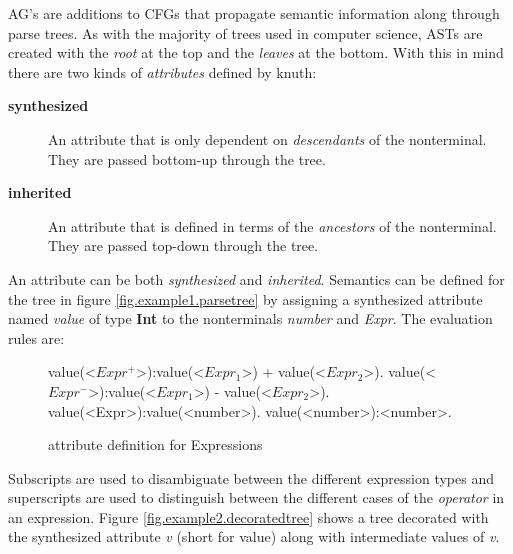 AG's are additions to CFGs that propagate semantic information along through parse trees. As with the majority of trees used in computer science, ASTs are created with the \emph{root} at the top and the \emph{leaves} at the bottom. With this in mind there are two kinds of \emph{attributes} defined by knuth\cite{knuth1}:
\begin{description}
\item[\textbf{synthesized}] An attribute that is only dependent on \emph{descendants} of the nonterminal. They are passed bottom-up through the tree.
\item[\textbf{inherited}] An attribute that is defined in terms of the \emph{ancestors} of the nonterminal. They are passed top-down through the tree.
\end{description}

An attribute can be both \emph{synthesized} and \emph{inherited}. Semantics can be defined for the tree in figure \ref{fig.example1.parsetree} by assigning a synthesized attribute named \emph{value} of type \textbf{Int} to the nonterminals \emph{number} and \emph{Expr}. The evaluation rules are:

\begin{figure}[H]
\begin{grammar}
value(<$Expr^+$>):value(<$Expr_1$>) + value(<$Expr_2$>). 
value(<$Expr^-$>):value(<$Expr_1$>) - value(<$Expr_2$>). 
value(<Expr>):value(<number>).
value(<number>):<number>.
\end{grammar}
\caption{attribute definition for Expressions}
\label{semantics:bnf:expr}
\end{figure}

Subscripts are used to disambiguate between the different expression types and  superscripts are used to distinguish between the different cases of the \emph{operator} in an expression. Figure \ref{fig.example2.decoratedtree} shows a tree decorated with the synthesized attribute \emph{v} (short for value) along with intermediate values of \emph{v}.

